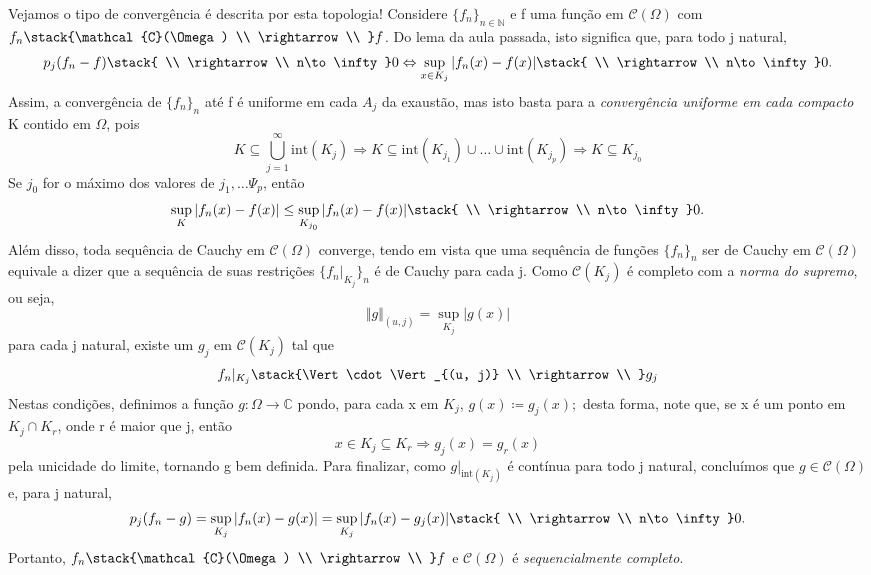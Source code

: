 \documentclass[../distribution_theory_notes.tex]{subfiles}
\begin{document}
\begin{example}
     Vejamos o tipo de convergência é descrita por esta topologia! Considere \(\{f_{n}\}_{n\in \mathbb{N}}\) e f uma função em \(\mathcal{C}(\Omega )\) com \(f_{n}\stack{\mathcal{C}(\Omega ) \\ \rightarrow \\ }f\). Do lema da aula passada, isto significa que, para todo j natural, 
       \[
         p_{j}(f_{n}-f)\stack{ \\ \rightarrow \\ n\to \infty}0 \Leftrightarrow \sup_{x\in K_{j}}|f_{n}(x)-f(x)|\stack{ \\ \rightarrow \\ n\to \infty}0.
       \]
       Assim, a convergência de \(\{f_{n}\}_{n}\) até f é uniforme em cada \(A_{j}\) da exaustão, mas isto basta para a \textit{convergência uniforme em cada compacto} K contido em \(\Omega \), pois 
      \[
        K\subseteq \bigcup_{j=1}^{\infty}\mathrm{int}(K_{j})\Rightarrow K\subseteq \mathrm{int}(K_{j_1})\cup \dotsc \cup \mathrm{int}(K_{j_p})\Rightarrow K\subseteq K_{j_{0}}
      \]
      Se \(j_{0}\) for o máximo dos valores de \(j_1,\dotsc \Psi _{p}\), então 
        \[
          \sup_{K}|f_{n}(x)-f(x)|\leq \sup_{K_{j_{0}}}|f_{n}(x)-f(x)|\stack{ \\ \rightarrow \\ n\to \infty}0.
        \]
        Além disso, toda sequência de Cauchy em \(\mathcal{C}(\Omega )\) converge, tendo em vista que uma sequência de funções \(\{f_{n}\}_{n}\) ser de Cauchy em \(\mathcal{C}(\Omega )\) equivale a dizer que a sequência de suas restrições \(\{f_{n}|_{K_{j}}\}_{n}\) é de Cauchy para cada j. Como \(\mathcal{C}(K_{j})\) é completo com a \textit{norma do supremo}, ou seja, 
          \[
            \Vert g \Vert_{(u, j)}=\sup_{K_{j}}|g(x)|
          \]
          para cada j natural, existe um \(g_{j}\) em \(\mathcal{C}(K_{j})\) tal que 
            \[
              f_{n}|_{K_{j}}\stack{\Vert \cdot  \Vert_{(u, j)} \\ \rightarrow \\ }g_{j}
            \]
            Nestas condições, definimos a função \(g:\Omega \rightarrow \mathbb{C}\) pondo, para cada x em \(K_{j}\), \(g(x)\coloneqq g_{j}(x);\) desta forma, note que, se x é um ponto em \(K_{j}\cap K_{r}\), onde r é maior que j, então 
              \[
                x\in K_{j}\subseteq K_{r}\Rightarrow g_{j}(x)=g_{r}(x)
              \]
              pela unicidade do limite, tornando g bem definida. Para finalizar, como \(g|_{\mathrm{int}(K_{j})}\) é contínua para todo j natural, concluímos que \(g\in \mathcal{C}(\Omega )\) e, para j natural, 
                \[
                  p_{j}(f_{n}-g)=\sup_{K_{j}}|f_{n}(x)-g(x)|=\sup_{K_{j}}|f_{n}(x)-g_{j}(x)|\stack{ \\ \rightarrow \\ n\to \infty}0.
                \]
                Portanto, \(f_{n}\stack{\mathcal{C}(\Omega ) \\ \rightarrow \\ }f\) e \(\mathcal{C}(\Omega )\) é \textit{sequencialmente completo}.
 \end{example}
\end{document}
